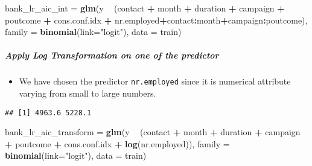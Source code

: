 \documentclass[
]{article}
\newenvironment{Shaded}{\begin{snugshade}}{\end{snugshade}}
\newcommand{\DataTypeTok}[1]{\textcolor[rgb]{0.13,0.29,0.53}{#1}}
\newcommand{\KeywordTok}[1]{\textcolor[rgb]{0.13,0.29,0.53}{\textbf{#1}}}
\newcommand{\NormalTok}[1]{#1}
\newcommand{\OperatorTok}[1]{\textcolor[rgb]{0.81,0.36,0.00}{\textbf{#1}}}
\newcommand{\StringTok}[1]{\textcolor[rgb]{0.31,0.60,0.02}{#1}}
\providecommand{\tightlist}{%
  \setlength{\itemsep}{0pt}\setlength{\parskip}{0pt}}
\begin{document}
\begin{Shaded}
\begin{Highlighting}[]
\NormalTok{bank_lr_aic_int =}\StringTok{ }\KeywordTok{glm}\NormalTok{(y }\OperatorTok{~}\StringTok{ }\NormalTok{(contact }\OperatorTok{+}\StringTok{ }\NormalTok{month }\OperatorTok{+}\StringTok{ }\NormalTok{duration }\OperatorTok{+}\StringTok{ }\NormalTok{campaign }\OperatorTok{+}\StringTok{ }\NormalTok{poutcome }\OperatorTok{+}\StringTok{ }\NormalTok{cons.conf.idx }\OperatorTok{+}\StringTok{ }\NormalTok{nr.employed}\OperatorTok{+}\NormalTok{contact}\OperatorTok{:}\NormalTok{month}\OperatorTok{+}\NormalTok{campaign}\OperatorTok{:}\NormalTok{poutcome), }\DataTypeTok{family =} \KeywordTok{binomial}\NormalTok{(}\DataTypeTok{link=}\StringTok{"logit"}\NormalTok{), }\DataTypeTok{data =}\NormalTok{ train)}
\end{Highlighting}
\end{Shaded}

\hypertarget{apply-log-transformation-on-one-of-the-predictor}{%
\subparagraph{Apply Log Transformation on one of the
predictor}\label{apply-log-transformation-on-one-of-the-predictor}}

\begin{itemize}
\tightlist
\item
  We have chosen the predictor \texttt{nr.employed} since it is
  numerical attribute varying from small to large numbers.
\end{itemize}

\begin{Shaded}
\end{Shaded}

\begin{verbatim}
## [1] 4963.6 5228.1
\end{verbatim}

\begin{Shaded}
\begin{Highlighting}[]
\NormalTok{bank_lr_aic_transform =}\StringTok{ }\KeywordTok{glm}\NormalTok{(y }\OperatorTok{~}\StringTok{ }\NormalTok{(contact }\OperatorTok{+}\StringTok{ }\NormalTok{month }\OperatorTok{+}\StringTok{ }\NormalTok{duration }\OperatorTok{+}\StringTok{ }\NormalTok{campaign }\OperatorTok{+}\StringTok{ }\NormalTok{poutcome }\OperatorTok{+}\StringTok{ }\NormalTok{cons.conf.idx }\OperatorTok{+}\StringTok{ }\KeywordTok{log}\NormalTok{(nr.employed)), }
    \DataTypeTok{family =} \KeywordTok{binomial}\NormalTok{(}\DataTypeTok{link=}\StringTok{"logit"}\NormalTok{), }\DataTypeTok{data =}\NormalTok{ train)}
\end{Highlighting}
\end{Shaded}
\end{document}
